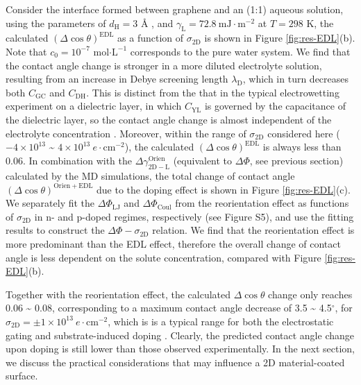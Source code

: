 \documentclass[journal=jacsat,manuscript=article,email=true,hyperref=true,keywords=true]{achemso}
\begin{document}
Consider the interface formed between graphene and an (1:1) aqueous
solution, using the parameters of \(d_{\mathrm{H}}=3\) Å
\cite{mcclendon_thickness_1927}, and \(\gamma_{\mathrm{L}}=72.8\
\mathrm{mJ}\cdot \mathrm{m}^{-2}\) at \(T=298\) K, the calculated
\((\Delta \cos \theta)^{\mathrm{EDL}}\) as a function of
\(\sigma_{\mathrm{2D}}\) is shown in Figure \ref{fig:res-EDL}(b).  Note
that \(c_{0}=10^{-7}\) mol\(\cdot \mathrm{L}^{-1}\) corresponds to the
pure water system. We find that the contact angle change is stronger
in a more diluted electrolyte solution, resulting from an increase in
Debye screening length \(\lambda_{\mathrm{D}}\), which in turn decreases
both \(C_{\mathrm{GC}}\) and \(C_{\mathrm{DH}}\). This is distinct from
the that in the typical electrowetting experiment on a dielectric
layer, in which \(C_{\mathrm{YL}}\) is governed by the capacitance of
the dielectric layer, so the contact angle change is almost
independent of the electrolyte concentration
\cite{Mugele_2005}. Moreover, within the range of \(\sigma_{\mathrm{2D}}\)
considered here (\(-4\times10^{13}\) \textasciitilde{} \(4\times10^{13}\ e\cdot
\mathrm{cm}^{-2}\)), the calculated \((\Delta \cos
\theta)^{\mathrm{EDL}}\) is always less than 0.06.  In combination with
the \(\Delta \gamma^{\mathrm{Orien}}_{\mathrm{2D-L}}\) (equivalent to
\(\Delta \Phi\), see previous section) calculated by the MD simulations,
the total change of contact angle \((\Delta \cos
\theta)^{\mathrm{Orien + EDL}}\) due to the doping effect is shown in
Figure \ref{fig:res-EDL}(c). We separately fit the \(\Delta
\Phi_{\mathrm{LJ}}\) and \(\Delta \Phi_{\mathrm{Coul}}\) from the
reorientation effect as functions of \(\sigma_{\mathrm{2D}}\) in n- and
p-doped regimes, respectively (see Figure S5), and use the fitting
results to construct the \(\Delta \Phi-\sigma_{\mathrm{2D}}\)
relation. We find that the reorientation effect is more predominant
than the EDL effect, therefore the overall change of contact angle is
less dependent on the solute concentration, compared with Figure
\ref{fig:res-EDL}(b).

Together with the reorientation effect, the calculated \(\Delta \cos
\theta\) change only reaches 0.06 \textasciitilde{} 0.08, corresponding to a maximum
contact angle decrease of 3.5 \textasciitilde{} 4.5\(^{\circ}\), for
\(\sigma_{\mathrm{2D}}=\pm1\times10^{13}\ e\cdot \mathrm{cm}^{-2}\),
which is is a typical range for both the electrostatic gating
\cite{hong_mechanism_2016} and substrate-induced doping
\cite{ashraf_doping-induced_2016}. Clearly, the predicted contact angle
change upon doping is still lower than those observed
experimentally. In the next section, we discuss the practical
considerations that may influence a 2D material-coated surface.
\end{document}
